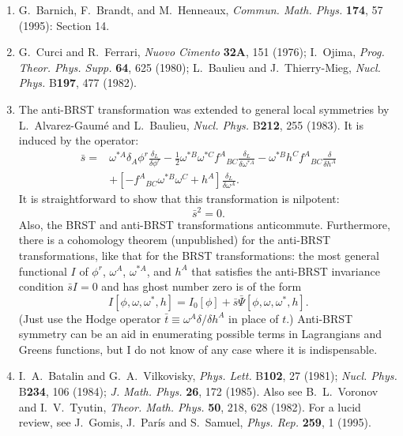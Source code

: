 \begin{enumerate}
  \item {}\label{ch15-ref-16}
  G.~Barnich, F.~Brandt, and M.~Henneaux, \textit{Commun. Math. Phys.} \textbf{174}, 57 (1995): Section 14.

  \item {}\label{ch15-ref-17}
  G.~Curci and R.~Ferrari, \textit{Nuovo Cimento} \textbf{32A}, 151 (1976); I.~Ojima, \textit{Prog. Theor. Phys. Supp.} \textbf{64}, 625 (1980); L.~Baulieu and J.~Thierry-Mieg, \textit{Nucl. Phys.} B\textbf{197}, 477 (1982).

  \item {}\label{ch15-ref-18}
  The anti-BRST transformation was extended to general local symmetries by L.~Alvarez-Gaum\'e and L.~Baulieu, \textit{Nucl. Phys.} B\textbf{212}, 255 (1983). It is induced by the operator:
  \begin{align*}
    \bar s={}&\omega^{*A}\delta_A\phi^r\frac{\delta_L}{\delta\phi^r}
    -\frac{1}{2}\omega^{*B}\omega^{*C}f^A{}_{BC}\frac{\delta_L}{\delta\omega^{*A}}
    -\omega^{*B}h^Cf^A{}_{BC}\frac{\delta}{\delta h^A}\\
    &+\left[-f^A{}_{BC}\omega^{*B}\omega^C+h^A\right]\frac{\delta_L}{\delta\omega^A}.
  \end{align*}
  It is straightforward to show that this transformation is nilpotent:
  \[
    \bar s^2=0.
  \]
  Also, the BRST and anti-BRST transformations anticommute. Furthermore, there is a cohomology theorem (unpublished) for the anti-BRST transformations, like that for the BRST transformations: the most general functional $I$ of $\phi^r$, $\omega^A$, $\omega^{*A}$, and $h^A$ that satisfies the anti-BRST invariance condition $\bar sI=0$ and has ghost number zero is of the form
  \[
    I[\phi,\omega,\omega^*,h]
    =I_0[\phi]+\bar s\bar\Psi[\phi,\omega,\omega^*,h].
  \]
  (Just use the Hodge operator $\bar t\equiv\omega^A\delta/\delta h^A$ in place of $t$.) Anti-BRST symmetry can be an aid in enumerating possible terms in Lagrangians and Greens functions, but I do not know of any case where it is indispensable.

  \item {}\label{ch15-ref-19}
  I.~A.~Batalin and G.~A.~Vilkovisky, \textit{Phys. Lett.} B\textbf{102}, 27 (1981); \textit{Nucl. Phys.} B\textbf{234}, 106 (1984); \textit{J. Math. Phys.} \textbf{26}, 172 (1985). Also see B.~L.~Voronov and I.~V.~Tyutin, \textit{Theor. Math. Phys.} \textbf{50}, 218, 628 (1982). For a lucid review, see J.~Gomis, J.~Par\'is and S.~Samuel, \textit{Phys. Rep.} \textbf{259}, 1 (1995).


\end{enumerate}

